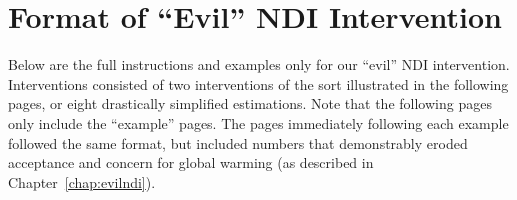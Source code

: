 \chapter{Format of \texorpdfstring{“Evil”}{"Evil"} NDI Intervention}
\label{app:format-ndi}

Below are the full instructions and examples only for our “evil” NDI intervention.
Interventions consisted of two interventions of the sort illustrated in the
following pages, or eight drastically simplified estimations. Note that the
following pages only include the “example” pages. The pages immediately
following each example followed the same format, but included numbers that
demonstrably eroded acceptance and concern for global warming (as described in
Chapter~\ref{chap:evilndi}).


